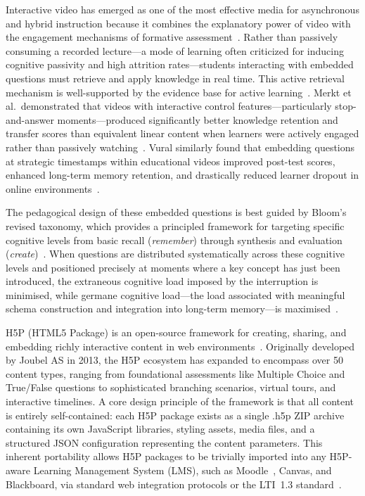 Interactive video has emerged as one of the most effective media for asynchronous and hybrid instruction because it combines the explanatory power of video with the engagement mechanisms of formative assessment~\cite{zhang2006}. Rather than passively consuming a recorded lecture—a mode of learning often criticized for inducing cognitive passivity and high attrition rates—students interacting with embedded questions must retrieve and apply knowledge in real time. This active retrieval mechanism is well-supported by the evidence base for active learning~\cite{freeman2014}. Merkt et al.\ demonstrated that videos with interactive control features---particularly stop-and-answer moments---produced significantly better knowledge retention and transfer scores than equivalent linear content when learners were actively engaged rather than passively watching~\cite{merkt2011}. Vural similarly found that embedding questions at strategic timestamps within educational videos improved post-test scores, enhanced long-term memory retention, and drastically reduced learner dropout in online environments~\cite{vural2013}.

The pedagogical design of these embedded questions is best guided by Bloom's revised taxonomy, which provides a principled framework for targeting specific cognitive levels from basic recall (\emph{remember}) through synthesis and evaluation (\emph{create})~\cite{anderson2001}. When questions are distributed systematically across these cognitive levels and positioned precisely at moments where a key concept has just been introduced, the extraneous cognitive load imposed by the interruption is minimised, while germane cognitive load---the load associated with meaningful schema construction and integration into long-term memory---is maximised~\cite{sweller1988,chandler1991,paas2003}.

H5P (HTML5 Package) is an open-source framework for creating, sharing, and embedding richly interactive content in web environments~\cite{h5p2023,lumieducation2023}. Originally developed by Joubel AS in 2013, the H5P ecosystem has expanded to encompass over 50 content types, ranging from foundational assessments like Multiple Choice and True/False questions to sophisticated branching scenarios, virtual tours, and interactive timelines. A core design principle of the framework is that all content is entirely self-contained: each H5P package exists as a single .h5p ZIP archive containing its own JavaScript libraries, styling assets, media files, and a structured JSON configuration representing the content parameters. This inherent portability allows H5P packages to be trivially imported into any H5P-aware Learning Management System (LMS), such as Moodle~\cite{moodle2023}, Canvas, and Blackboard, via standard web integration protocols or the LTI~1.3 standard~\cite{lti2019}.

